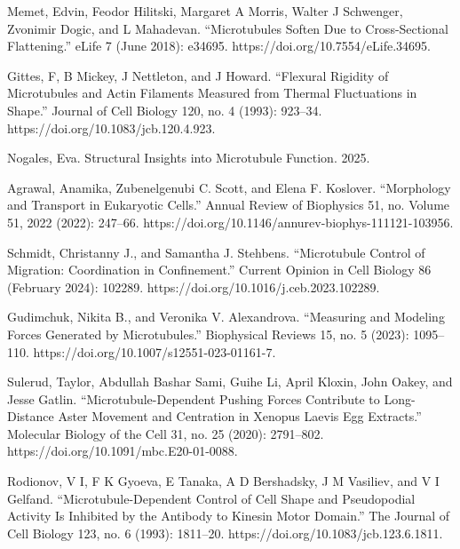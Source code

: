 \begin{thebibliography}{00} %

Memet, Edvin, Feodor Hilitski, Margaret A Morris, Walter J Schwenger, Zvonimir Dogic, and L Mahadevan. “Microtubules Soften Due to Cross-Sectional Flattening.” eLife 7 (June 2018): e34695. https://doi.org/10.7554/eLife.34695.

Gittes, F, B Mickey, J Nettleton, and J Howard. “Flexural Rigidity of Microtubules and Actin Filaments Measured from Thermal Fluctuations in Shape.” Journal of Cell Biology 120, no. 4 (1993): 923–34. https://doi.org/10.1083/jcb.120.4.923.



Nogales, Eva. Structural Insights into Microtubule Function. 2025. %

Agrawal, Anamika, Zubenelgenubi C. Scott, and Elena F. Koslover. “Morphology and Transport in Eukaryotic Cells.” Annual Review of Biophysics 51, no. Volume 51, 2022 (2022): 247–66. https://doi.org/10.1146/annurev-biophys-111121-103956. %

Schmidt, Christanny J., and Samantha J. Stehbens. “Microtubule Control of Migration: Coordination in Confinement.” Current Opinion in Cell Biology 86 (February 2024): 102289. https://doi.org/10.1016/j.ceb.2023.102289. %

\bibitem[]{}
Gudimchuk, Nikita B., and Veronika V. Alexandrova. “Measuring and Modeling Forces Generated by Microtubules.” Biophysical Reviews 15, no. 5 (2023): 1095–110. https://doi.org/10.1007/s12551-023-01161-7. %

\bibitem[]{}
Sulerud, Taylor, Abdullah Bashar Sami, Guihe Li, April Kloxin, John Oakey, and Jesse Gatlin. “Microtubule-Dependent Pushing Forces Contribute to Long-Distance Aster Movement and Centration in Xenopus Laevis Egg Extracts.” Molecular Biology of the Cell 31, no. 25 (2020): 2791–802. https://doi.org/10.1091/mbc.E20-01-0088. %

\bibitem[]{}
Rodionov, V I, F K Gyoeva, E Tanaka, A D Bershadsky, J M Vasiliev, and V I Gelfand. “Microtubule-Dependent Control of Cell Shape and Pseudopodial Activity Is Inhibited by the Antibody to Kinesin Motor Domain.” The Journal of Cell Biology 123, no. 6 (1993): 1811–20. https://doi.org/10.1083/jcb.123.6.1811. %


\end{thebibliography}
